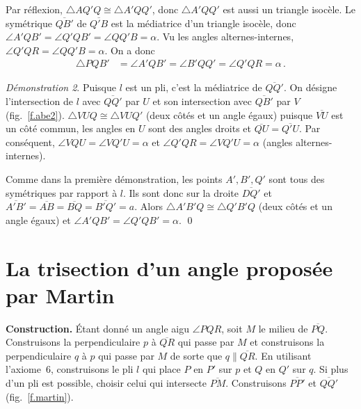 Par réflexion, $\triangle AQ'Q\cong \triangle A'QQ'$, donc $\triangle A'QQ'$ est aussi un triangle isocèle.
 Le symétrique $\overline{QB'}$ de  $\overline{Q'B}$ est la médiatrice d'un triangle isocèle, donc $\angle A'QB'=\angle Q'QB'=\angle QQ'B=\alpha$.
Vu les angles alternes-internes, $\angle Q'QR=\angle QQ'B=\alpha$.
On a donc 
\begin{align*}
\triangle PQB'&=\angle A'QB'=\angle B'QQ'=\angle Q'QR=\alpha\,.
\tag*{\qed} 
\end{align*}

\noindent \emph{Démonstration  2}.
Puisque $l$ est un pli, c'est la médiatrice de $\overline{QQ'}$. On désigne l'intersection de $l$ avec $\overline{QQ'}$ par $U$ et son intersection avec $\overline{QB'}$ par $V$ (fig.~\ref{f.abe2}). $\triangle VUQ\cong \triangle VUQ'$ (deux côtés et un angle égaux) puisque $\overline{VU}$ est un côté commun, les angles en $U$ sont des angles droits et $\overline{QU}=\overline{Q'U}$. Par conséquent, $\angle VQU=\angle VQ'U=\alpha$ et $\angle Q'QR=\angle VQ'U=\alpha$ (angles alternes-internes).

Comme dans la première démonstration, les points  $A', B', Q'$ sont tous des symétriques par rapport à $l$. Ils sont donc sur la droite $\overline{DQ'}$ et $\overline{A'B'}=\overline{AB}=\overline{BQ}=\overline{B'Q'}=a$. Alors $\triangle A'B'Q\cong\triangle Q'B'Q$ (deux côtés et un angle égaux) et $\angle A'QB'=\angle Q'QB'=\alpha$.
\qed



\section{La trisection d'un angle proposée par Martin}\label{s.martin-trisection}


\noindent\textbf{Construction.}
Étant donné un angle aigu $\angle PQR$, soit $M$ le milieu de $\overline{PQ}$. Construisons  la perpendiculaire $p$ à $\overline{QR}$ qui passe par $M$ et construisons  la perpendiculaire $q$ à $p$ qui passe par $M$ de sorte que $q\parallel\overline{QR}$. En utilisant l'axiome~6, construisons le pli $l$ qui place $P$ en $P'$ sur $p$ et $Q$ en $Q'$ sur $q$. Si plus d'un pli est possible, choisir celui qui intersecte $\overline{PM}$. Construisons $\overline{PP'}$ et $\overline{QQ'}$   (fig.~\ref{f.martin}).


